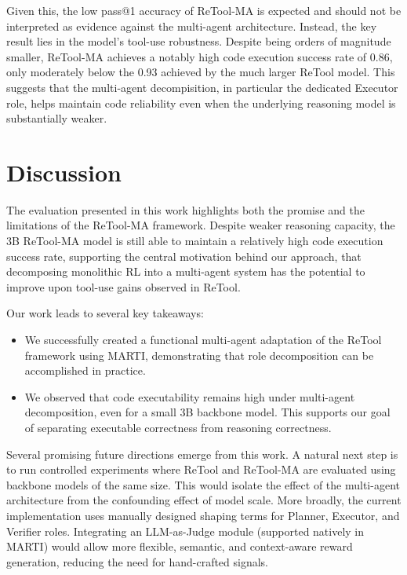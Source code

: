 \documentclass{article}
\begin{document}
Given this, the low pass@1 accuracy of ReTool-MA is expected and should not be 
interpreted as evidence against the multi-agent architecture. Instead, the key 
result lies in the model's tool-use robustness. Despite being orders
of magnitude smaller, ReTool-MA achieves a notably high code execution success 
rate of 0.86, only moderately below the 0.93 achieved by the much larger ReTool 
model. This suggests that the multi-agent decompisition, in particular the 
dedicated Executor role, helps maintain code reliability even when the 
underlying reasoning model is substantially weaker.

\section{Discussion}

The evaluation presented in this work highlights both the promise and the 
limitations of the ReTool-MA framework. Despite weaker reasoning 
capacity, the 3B ReTool-MA model is still able to maintain a relatively high code 
execution success rate, supporting the central motivation behind 
our approach, that decomposing monolithic RL into a multi-agent system 
has the potential to improve upon tool-use gains observed in ReTool.

Our work leads to several key takeaways:
\begin{itemize}
    \item We successfully created a functional multi-agent adaptation of the 
    ReTool framework using MARTI, demonstrating that role decomposition can be 
    accomplished in practice.
    \item We observed that code executability remains high under multi-agent 
    decomposition, even for a small 3B backbone model. This supports our goal of 
    separating executable correctness from reasoning correctness.
\end{itemize}

Several promising future directions emerge from this work. A natural next step is to run 
controlled experiments where ReTool and ReTool-MA are evaluated using 
backbone models of the same size. This would isolate the effect of the 
multi-agent architecture from the confounding effect of model scale.
More broadly, the current implementation uses manually designed shaping terms for Planner, 
Executor, and Verifier roles. Integrating an LLM-as-Judge module (supported natively 
in MARTI) would allow more flexible, semantic, and context-aware reward 
generation, reducing the need for hand-crafted signals.


\end{document}
